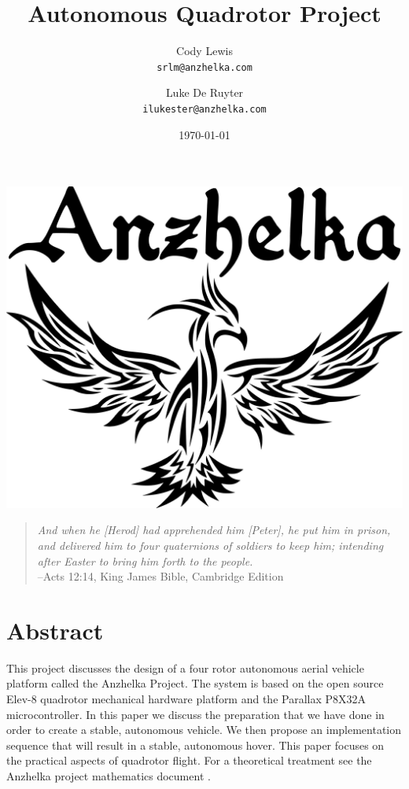 \documentclass{article}
\numberwithin{equation}{section} %
\begin{document}
\title{Autonomous Quadrotor Project}
\author{Cody Lewis \\ \texttt{srlm@anzhelka.com} \and Luke De Ruyter \\ \texttt{ilukester@anzhelka.com} }
\date{\today}
\maketitle
\bigskip \bigskip \bigskip
\begin{center}\includegraphics[scale=.24]{tribal_phoenix.jpg}\end{center}
\bigskip \bigskip \bigskip
\begin{verse}\textit{
And when he [Herod] had apprehended him [Peter], he put him in prison, and delivered him to four quaternions of soldiers to keep him; intending after Easter to bring him forth to the people.} \\
\hfill --Acts 12:14, King James Bible, Cambridge Edition
\end{verse}



\newpage
{}
\section*{Abstract}
This project discusses the design of a four rotor autonomous aerial vehicle platform called the Anzhelka Project. The system is based on the open source Elev-8 quadrotor mechanical hardware platform and the Parallax P8X32A microcontroller. In this paper we discuss the preparation that we have done in order to create a stable, autonomous vehicle. We then propose an implementation sequence that will result in a stable, autonomous hover. This paper focuses on the practical aspects of quadrotor flight. For a theoretical treatment see the Anzhelka project mathematics document \cite{anzhelka_math}.
\end{document}
